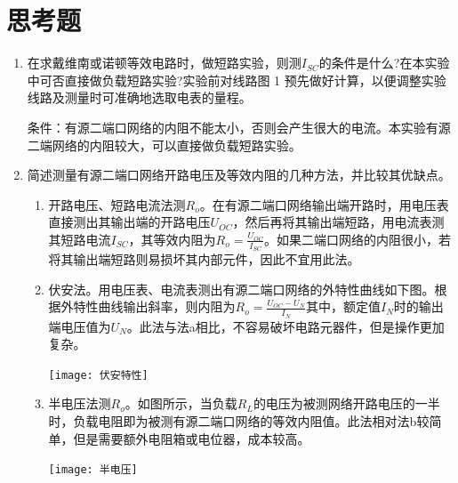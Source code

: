 \documentclass{../source/Experiment}
\begin{document}
    \section{思考题}
            \begin{enumerate}
                \item 在求戴维南或诺顿等效电路时，做短路实验，则测$I_{SC}$的条件是什么?在本实验中可否直接做负载短路实验?实验前对线路图 1 预先做好计算，以便调整实验线路及测量时可准确地选取电表的量程。
                \par 条件：有源二端口网络的内阻不能太小，否则会产生很大的电流。本实验有源二端网络的内阻较大，可以直接做负载短路实验。
                \item 简述测量有源二端口网络开路电压及等效内阻的几种方法，并比较其优缺点。 
                \par  
                \begin{enumerate}
                    \item 开路电压、短路电流法测$R_o$。在有源二端口网络输出端开路时，用电压表直接测出其输出端的开路电压$U_{OC}$，然后再将其输出端短路，用电流表测其短路电流$I_{SC}$，其等效内阻为$R_o = \frac{U_{OC}}{I_{SC}}$。如果二端口网络的内阻很小，若将其输出端短路则易损坏其内部元件，因此不宜用此法。
                    \item 伏安法。用电压表、电流表测出有源二端口网络的外特性曲线如下图。根据外特性曲线输出斜率，则内阻为$R_o = \frac{U_{OC} - U_N}{I_N}$其中，额定值$I_N$时的输出端电压值为$U_N$。此法与法a相比，不容易破坏电路元器件，但是操作更加复杂。
                    \begin{center}
                        \texttt{[image: 伏安特性]}
                    \end{center}
                    \item 半电压法测$R_o$。如图所示，当负载$R_L$的电压为被测网络开路电压的一半时，负载电阻即为被测有源二端口网络的等效内阻值。此法相对法b较简单，但是需要额外电阻箱或电位器，成本较高。
                    \begin{center}
                        \texttt{[image: 半电压]}
                    \end{center}
                \end{enumerate}
            \end{enumerate}
\end{document}
